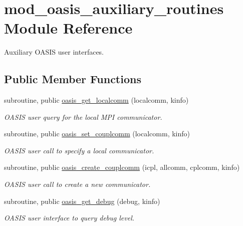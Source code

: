 \hypertarget{classmod__oasis__auxiliary__routines}{\section{mod\+\_\+oasis\+\_\+auxiliary\+\_\+routines Module Reference}
\label{classmod__oasis__auxiliary__routines}
}


Auxiliary O\+A\+S\+I\+S user interfaces.  


\subsection*{Public Member Functions}
\begin{DoxyCompactItemize}
\item 
subroutine, public \hyperlink{classmod__oasis__auxiliary__routines_a905dc11bc7613c7ac94054cf92fc2736}{oasis\+\_\+get\+\_\+localcomm} (localcomm, kinfo)
\begin{DoxyCompactList}\small\item\em O\+A\+S\+I\+S user query for the local M\+P\+I communicator. \end{DoxyCompactList}\item 
subroutine, public \hyperlink{classmod__oasis__auxiliary__routines_a42c3fe19a188de66499094e988c51938}{oasis\+\_\+set\+\_\+couplcomm} (localcomm, kinfo)
\begin{DoxyCompactList}\small\item\em O\+A\+S\+I\+S user call to specify a local communicator. \end{DoxyCompactList}\item 
subroutine, public \hyperlink{classmod__oasis__auxiliary__routines_aede33b301679f532ecd300488358ab71}{oasis\+\_\+create\+\_\+couplcomm} (icpl, allcomm, cplcomm, kinfo)
\begin{DoxyCompactList}\small\item\em O\+A\+S\+I\+S user call to create a new communicator. \end{DoxyCompactList}\item 
subroutine, public \hyperlink{classmod__oasis__auxiliary__routines_a940777065691d5eab0402b0bb40464c7}{oasis\+\_\+get\+\_\+debug} (debug, kinfo)
\begin{DoxyCompactList}\small\item\em O\+A\+S\+I\+S user interface to query debug level. \end{DoxyCompactList}\item 

\end{DoxyCompactItemize}
